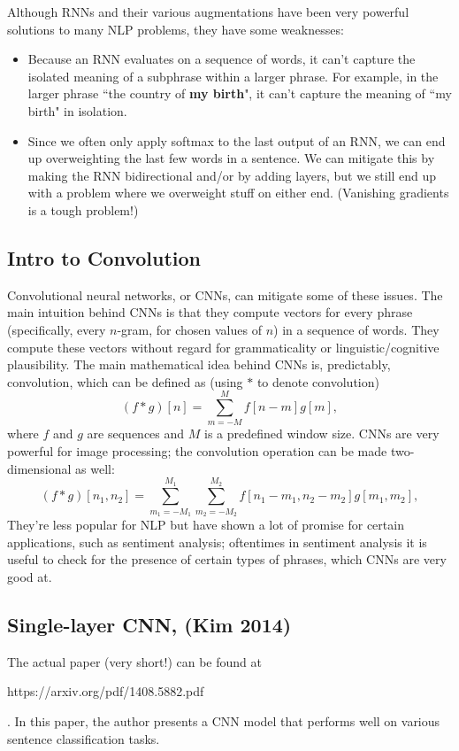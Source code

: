Although RNNs and their various augmentations have been very powerful solutions to many NLP problems, they have some weaknesses:
\begin{itemize}
\item Because an RNN evaluates on a sequence of words, it can't capture the isolated meaning of a subphrase within a larger phrase. For example, in the larger phrase ``the country of \textbf{my birth}", it can't capture the meaning of ``my birth" in isolation.
\item Since we often only apply softmax to the last output of an RNN, we can end up overweighting the last few words in a sentence. We can mitigate this by making the RNN bidirectional and/or by adding layers, but we still end up with a problem where we overweight stuff on either end. (Vanishing gradients is a tough problem!)
\end{itemize}

\subsection{Intro to Convolution}

Convolutional neural networks, or CNNs, can mitigate some of these issues. The main intuition behind CNNs is that they compute vectors for every phrase (specifically, every $n$-gram, for chosen values of $n$) in a sequence of words. They compute these vectors without regard for grammaticality or linguistic/cognitive plausibility. The main mathematical idea behind CNNs is, predictably, convolution, which can be defined as (using $*$ to denote convolution)
$$(f * g)[n] = \sum_{m=-M}^M f[n-m]g[m],$$
where $f$ and $g$ are sequences and $M$ is a predefined window size. CNNs are very powerful for image processing; the convolution operation can be made two-dimensional as well:
$$(f * g)[n_1, n_2] = \sum_{m_1=-M_1}^{M_1} \sum_{m_2 = -M_2}^{M_2} f[n_1 - m_1, n_2 - m_2]g[m_1, m_2],$$
They're less popular for NLP but have shown a lot of promise for certain applications, such as sentiment analysis; oftentimes in sentiment analysis it is useful to check for the presence of certain types of phrases, which CNNs are very good at.

\subsection{Single-layer CNN, (Kim 2014)}
The actual paper (very short!) can be found at \begin{tt}https://arxiv.org/pdf/1408.5882.pdf\end{tt}. In this paper, the author presents a CNN model that performs well on various sentence classification tasks.

